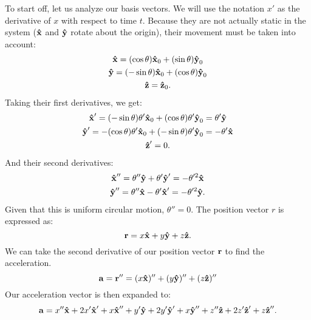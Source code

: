 To start off, let us analyze our basis vectors.
We will use the notation $x'$ as the derivative of $x$ with respect to time $t$.
Because they are not actually static in the system ($\uvec{x}$ and $\uvec{y}$ rotate about the origin), their movement must be taken into account:
\begin{gather*}
	\uvec{x} = (\cos\theta)\uvec{x}_0 + (\sin\theta)\uvec{y}_0 \\
	\uvec{y} = (-\sin\theta)\uvec{x}_0 + (\cos\theta)\uvec{y}_0 \\
	\uvec{z} = \uvec{z}_0 \text{.}
\end{gather*}
Taking their first derivatives, we get:
\begin{gather*}
	\uvec{x}' = (-\sin\theta)\theta'\uvec{x}_0 + (\cos\theta)\theta'\uvec{y}_0 = \theta'\uvec{y} \\
	\uvec{y}' = -(\cos\theta)\theta'\uvec{x}_0 + (-\sin\theta)\theta'\uvec{y}_0 = -\theta'\uvec{x} \\
	\uvec{z}' = 0 \text{.}
\end{gather*}
And their second derivatives:
\begin{gather*}
	\uvec{x}'' = \theta''\uvec{y} + \theta'\uvec{y}' =  - \theta'^2\uvec{x} \\
	\uvec{y}'' = \theta''\uvec{x} - \theta'\uvec{x}' =  - \theta'^2\uvec{y} \text{.}
\end{gather*}
Given that this is uniform circular motion, $\theta'' = 0$.
The position vector $r$ is expressed as:
\begin{equation*}
	\bvec{r} = x\uvec{x} + y\uvec{y} + z\uvec{z} \text{.}
\end{equation*}
We can take the second derivative of our position vector $\bm{\mathbf{r}}$ to find the acceleration.
\begin{equation*}
	\bvec{a} = \bvec{r}'' = (x\uvec{x})'' + (y\uvec{y})'' + (z\uvec{z})''
\end{equation*}
Our acceleration vector is then expanded to:
\begin{equation*}
	\bvec{a} = x''\uvec{x} + 2x'\uvec{x}' + x\uvec{x}'' + y'\uvec{y} + 2y'\uvec{y}' + x\uvec{y}'' + z''\uvec{z} + 2z'\uvec{z}' + z\uvec{z}'' \text{.}
\end{equation*}
